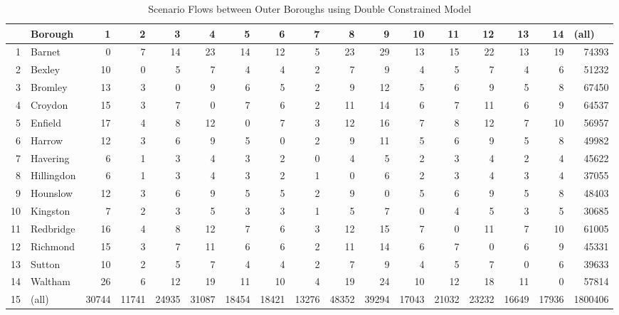 \documentclass[11pt]{article} %
\begin{document}

\begin{table}
\footnotesize
\caption{Scenario Flows between Outer Boroughs using Double Constrained Model}
\begin{tabular}{|r|l|r|r|r|r|r|r|r|r|r|r|r|r|r|r|r|}
\hline
\multicolumn{1}{|l|}{} & Borough & 1 & 2 & 3 & 4 & 5 & 6 & 7 & 8 & 9 & 10 & 11 & 12 & 13 & 14 & \multicolumn{1}{l|}{(all)} \\ \hline
1 & Barnet & 0 & 7 & 14 & 23 & 14 & 12 & 5 & 23 & 29 & 13 & 15 & 22 & 13 & 19 & 74393 \\ \hline
2 & Bexley & 10 & 0 & 5 & 7 & 4 & 4 & 2 & 7 & 9 & 4 & 5 & 7 & 4 & 6 & 51232 \\ \hline
3 & Bromley & 13 & 3 & 0 & 9 & 6 & 5 & 2 & 9 & 12 & 5 & 6 & 9 & 5 & 8 & 67450 \\ \hline
4 & Croydon & 15 & 3 & 7 & 0 & 7 & 6 & 2 & 11 & 14 & 6 & 7 & 11 & 6 & 9 & 64537 \\ \hline
5 & Enfield & 17 & 4 & 8 & 12 & 0 & 7 & 3 & 12 & 16 & 7 & 8 & 12 & 7 & 10 & 56957 \\ \hline
6 & Harrow & 12 & 3 & 6 & 9 & 5 & 0 & 2 & 9 & 11 & 5 & 6 & 9 & 5 & 8 & 49982 \\ \hline
7 & Havering & 6 & 1 & 3 & 4 & 3 & 2 & 0 & 4 & 5 & 2 & 3 & 4 & 2 & 4 & 45622 \\ \hline
8 & Hillingdon & 6 & 1 & 3 & 4 & 3 & 2 & 1 & 0 & 6 & 2 & 3 & 4 & 3 & 4 & 37055 \\ \hline
9 & Hounslow & 12 & 3 & 6 & 9 & 5 & 5 & 2 & 9 & 0 & 5 & 6 & 9 & 5 & 8 & 48403 \\ \hline
10 & Kingston & 7 & 2 & 3 & 5 & 3 & 3 & 1 & 5 & 7 & 0 & 4 & 5 & 3 & 5 & 30685 \\ \hline
11 & Redbridge & 16 & 4 & 8 & 12 & 7 & 6 & 3 & 12 & 15 & 7 & 0 & 11 & 7 & 10 & 61005 \\ \hline
12 & Richmond & 15 & 3 & 7 & 11 & 6 & 6 & 2 & 11 & 14 & 6 & 7 & 0 & 6 & 9 & 45331 \\ \hline
13 & Sutton & 10 & 2 & 5 & 7 & 4 & 4 & 2 & 7 & 9 & 4 & 5 & 7 & 0 & 6 & 39633 \\ \hline
14 & Waltham & 26 & 6 & 12 & 19 & 11 & 10 & 4 & 19 & 24 & 10 & 12 & 18 & 11 & 0 & 57814 \\ \hline
15 & (all) & 30744 & 11741 & 24935 & 31087 & 18454 & 18421 & 13276 & 48352 & 39294 & 17043 & 21032 & 23232 & 16649 & 17936 & 1800406 \\ \hline
\end{tabular}
\label{Estimated Flows Double}
\end{table}
\end{document}

